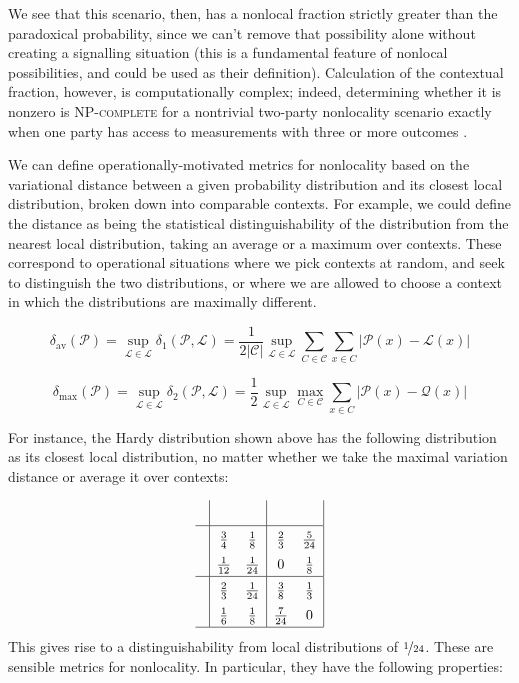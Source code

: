 \documentclass{amsart}
\theoremstyle{definition}
\begin{document}
We see that this scenario, then, has a nonlocal fraction strictly greater than the paradoxical probability, since we can't remove that possibility alone without creating a signalling situation (this is a fundamental feature of nonlocal possibilities, and could be used as their definition). Calculation of the contextual fraction, however, is computationally complex; indeed, determining whether it is nonzero is \textsc{NP-complete} for a 
nontrivial two-party nonlocality scenario exactly when one party has access to measurements with three or more outcomes \cite{SimmCC}.

We can define operationally-motivated metrics for nonlocality based on the variational distance between a given probability distribution and its closest local distribution, broken down into comparable contexts. For example, we could define the distance as being the statistical distinguishability of the distribution from the nearest local distribution, taking an average or a maximum over contexts. These correspond to operational situations where we pick contexts at random, and seek to distinguish the two distributions, or where we are allowed to choose a context in which the distributions are maximally different.

\begin{equation}
\delta_{\mbox{av}}(\mathcal{P})=\sup_{\mathcal{L}\in\mathscr{L}}\delta_1(\mathcal{P},\mathcal{L})=\frac{1}{2\left|\mathcal{C}\right|}\sup_{\mathcal{L}\in\mathscr{L}}\sum_{C\in\mathcal{C}}\sum_{x\in C}\left|\mathcal{P}(x)-\mathcal{L}(x)\right|
\end{equation}

\begin{equation}
\delta_{\mbox{max}}(\mathcal{P})=\sup_{\mathcal{L}\in\mathscr{L}}\delta_2(\mathcal{P},\mathcal{L})=\frac{1}{2}\sup_{\mathcal{L}\in\mathscr{L}}\max_{C\in\mathcal{C}}\sum_{x\in C}\left|\mathcal{P}(x)-\mathcal{Q}(x)\right|
\end{equation}

For instance, the Hardy distribution shown above has the following distribution as its closest local distribution, no matter whether we take the maximal variation distance or average it over contexts:

\begin{equation}\renewcommand{\arraystretch}{1.5}
\begin{array}{c| c c | c c |} 
&&&&\\\hline
&\frac{3}{4} &\frac{1}{8}  &\frac{2}{3} & \frac{5}{24}\\
&\frac{1}{12} &\frac{1}{24}  &0 &\frac{1}{8}\\ \hline
&\frac{2}{3}&\frac{1}{24}&\frac{3}{8} &\frac{1}{3} \\
&\frac{1}{6}&\frac{1}{8} &\frac{7}{24} &0 \\ \hline
\end{array} \renewcommand{\arraystretch}{1}
\end{equation}
This gives rise to a distinguishability from local distributions of $\nicefrac{1}{24}$.
These are sensible metrics for nonlocality. In particular, they have the following properties:
\end{document}
